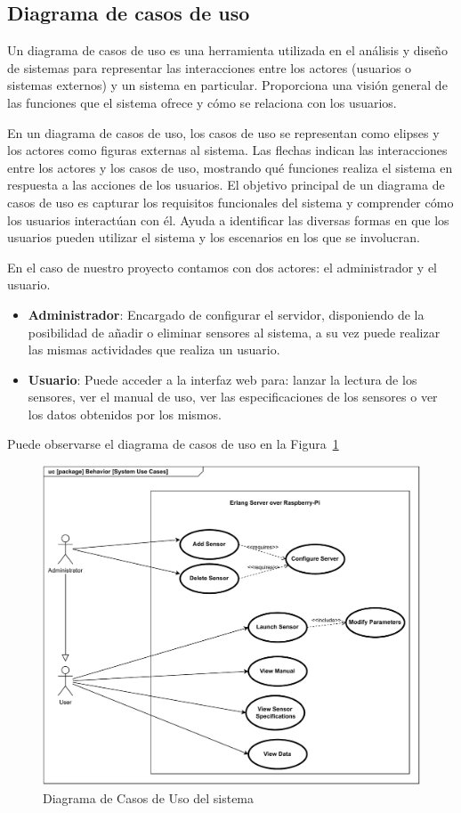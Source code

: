 \subsection{Diagrama de casos de uso}

Un diagrama de casos de uso es una herramienta utilizada en el análisis y diseño de sistemas para representar las interacciones entre los actores (usuarios o sistemas externos) y un sistema en particular. Proporciona una visión general de las funciones que el sistema ofrece y cómo se relaciona con los usuarios.

En un diagrama de casos de uso, los casos de uso se representan como elipses y los actores como figuras externas al sistema. Las flechas indican las interacciones entre los actores y los casos de uso, mostrando qué funciones realiza el sistema en respuesta a las acciones de los usuarios. El objetivo principal de un diagrama de casos de uso es capturar los requisitos funcionales del sistema y comprender cómo los usuarios interactúan con él. Ayuda a identificar las diversas formas en que los usuarios pueden utilizar el sistema y los escenarios en los que se involucran.

En el caso de nuestro proyecto contamos con dos actores: el administrador y el usuario.
\begin{itemize}
    \item \textbf{Administrador}: Encargado de configurar el servidor, disponiendo de la posibilidad de añadir o eliminar sensores al sistema, a su vez puede realizar las mismas actividades que realiza un usuario.
    \item \textbf{Usuario}: Puede acceder a la interfaz web para: lanzar la lectura de los sensores, ver el manual de uso, ver las especificaciones de los sensores o ver los datos obtenidos por los mismos.
\end{itemize}

Puede observarse el diagrama de casos de uso en la Figura~\ref{fig:usecases}


\begin{figure}[h!]
\centering
\includegraphics[width=\textwidth]{images/casosUso.pdf}
\caption{Diagrama de Casos de Uso del sistema}%
\label{fig:usecases}
\end{figure}

